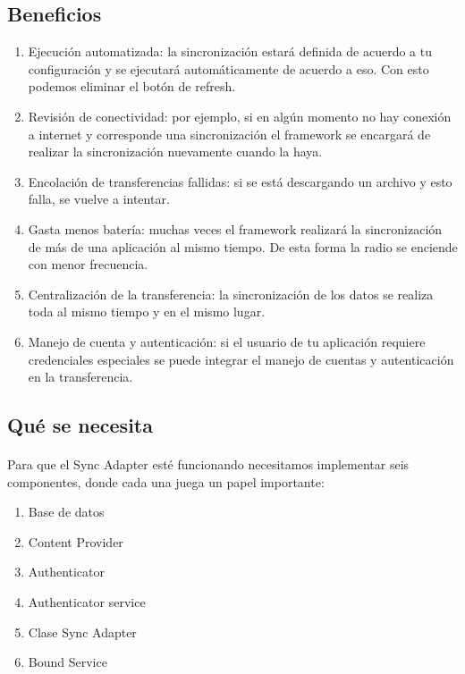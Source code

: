 \documentclass[10pt]{extarticle}
\begin{document}
\subsection{Beneficios}

\begin{enumerate}
 \item Ejecución automatizada: la sincronización estará definida de acuerdo a tu configuración y se ejecutará automáticamente de acuerdo a eso. Con esto podemos eliminar el botón de refresh.
 \item Revisión de conectividad: por ejemplo, si en algún momento no hay conexión a internet y corresponde una sincronización el framework se encargará de realizar la sincronización nuevamente cuando la haya.
 \item Encolación de transferencias fallidas: si se está descargando un archivo y esto falla, se vuelve a intentar.
 \item Gasta menos batería: muchas veces el framework realizará la sincronización de más de una aplicación al mismo tiempo. De esta forma la radio se enciende con menor frecuencia.
 \item Centralización de la transferencia: la sincronización de los datos se realiza toda al mismo tiempo y en el mismo lugar.
 \item Manejo de cuenta y autenticación: si el usuario de tu aplicación requiere credenciales especiales se puede integrar el manejo de cuentas y autenticación en la transferencia.
\end{enumerate}

\subsection{Qué se necesita}

\paragraph{}
Para que el Sync Adapter esté funcionando necesitamos implementar seis componentes, donde cada una juega un papel importante:

\begin{enumerate}
 \item Base de datos
 \item Content Provider
 \item Authenticator
 \item Authenticator service
 \item Clase Sync Adapter
 \item Bound Service
\end{enumerate}
\end{document}
